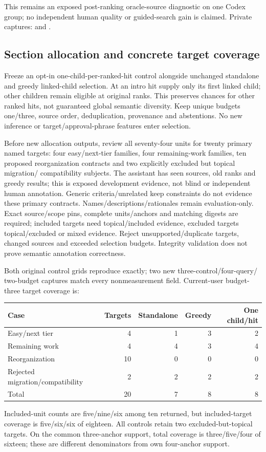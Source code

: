 \documentclass[11pt]{article}
\begin{document}
This remains an exposed post-ranking oracle-source diagnostic on one Codex group;
no independent human quality or guided-search gain is claimed. Private captures:
and .

\subsection{Section allocation and concrete target coverage}
Freeze an opt-in one-child-per-ranked-hit control alongside unchanged standalone
and greedy linked-child selection. At an intro hit supply only its first linked
child; other children remain eligible at original ranks. This preserves chances
for other ranked hits, not guaranteed global semantic diversity. Keep unique
budgets one/three, source order, deduplication, provenance and abstentions. No new
inference or target/approval-phrase features enter selection.

Before new allocation outputs, review all seventy-four units for twenty primary
named targets: four easy/next-tier families, four remaining-work families, ten
proposed reorganization contracts and two explicitly excluded but topical migration/
compatibility subjects. The assistant has seen sources, old ranks and greedy results;
this is exposed development evidence, not blind or independent human annotation.
Generic criteria/unrelated keep constraints do not evidence these primary contracts.
Names/descriptions/rationales remain evaluation-only. Exact source/scope pins,
complete units/anchors and matching digests are required; included targets need
topical/included evidence, excluded targets topical/excluded or mixed evidence.
Reject unsupported/duplicate targets, changed sources and exceeded selection budgets.
Integrity validation does not prove semantic annotation correctness.

Both original control grids reproduce exactly; two new three-control/four-query/
two-budget captures match every nonmeasurement field. Current-user budget-three
target coverage is:
\begin{center}
\begin{tabular}{lrrrr}
\hline
Case & Targets & Standalone & Greedy & One child/hit \\
\hline
Easy/next tier & 4 & 1 & 3 & 2 \\
Remaining work & 4 & 4 & 3 & 4 \\
Reorganization & 10 & 0 & 0 & 0 \\
Rejected migration/compatibility & 2 & 2 & 2 & 2 \\
Total & 20 & 7 & 8 & 8 \\
\hline
\end{tabular}
\end{center}
Included-unit counts are five/nine/six among ten returned, but included-target
coverage is five/six/six of eighteen. All controls retain two excluded-but-topical
targets. On the common three-anchor support, total coverage is three/five/four of
sixteen; these are different denominators from own four-anchor support.
\end{document}
